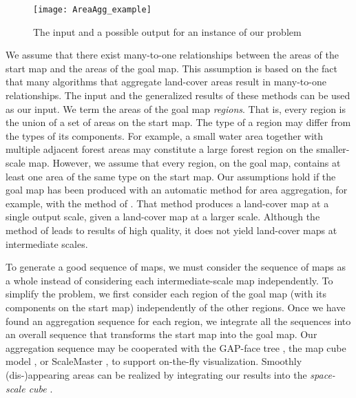 \begin{figure}[tb]
	\centering
	\texttt{[image: AreaAgg\_example]}
	\caption{The input and a possible output for an instance of 
	our problem}
	\label{fig:AreaAgg_example}
\end{figure}

We assume that there exist many-to-one relationships between the 
areas of the
start map and the areas of the goal map.
This assumption is based on the fact that many algorithms 
\parencite[e.g.,][]{HaunertWolff2010AreaAgg,
vanSmaalen2003,Oehrlein2017Aggregation}
that aggregate land-cover areas
result in many-to-one relationships.
The input and the generalized results of these methods 
can be used as our input.
We term the areas of the goal map \emph{regions}.
That is, every region is the union of a set of areas 
on the start map.
The type of a region may differ from the types of its 
components. 
For example, a small water area together with 
multiple adjacent forest areas may constitute 
a large forest region on the smaller-scale map.
However, we assume that every region, on the goal map, 
contains at least one area of the same type on the start map.
Our assumptions hold if the goal map has been produced 
with an automatic method for area aggregation, 
for example, with the method of \citet{HaunertWolff2010AreaAgg}.
That method produces a land-cover map at a single output scale, 
given a land-cover map at a larger scale.
Although the method of \textcite{HaunertWolff2010AreaAgg}
leads to results of high quality, 
it does not yield land-cover maps at intermediate scales.


To generate a good sequence of maps, 
we must consider the sequence of maps as a whole 
instead of considering each intermediate-scale map independently.
To simplify the problem,
we first consider each region of the goal map 
(with its components on the start map) 
independently of the other regions.
Once we have found an aggregation sequence for each region, 
we integrate all the sequences into an overall sequence 
that transforms the start map into the goal map. 
Our aggregation sequence may be cooperated with
the GAP-face tree \citep{vanOosterom2005},
the map cube model \citep{Timpf1998},
or ScaleMaster \citep{Brewer2007Guidelines,Touya2013ScaleMaster}, 
to support on-the-fly visualization.
Smoothly (dis-)appearing areas can be realized
by integrating our results into the \emph{space-scale cube}
\parencite{vanOosterom2014tGAP,vanOosterom2014tGAPSSC}.


